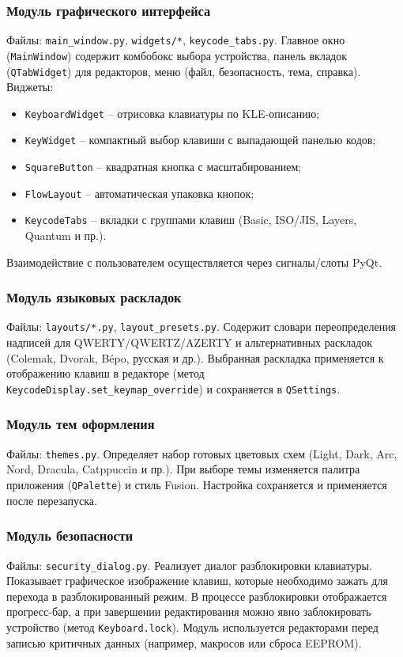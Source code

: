 \subsubsection{Модуль графического интерфейса}
Файлы: \texttt{main\_window.py}, \texttt{widgets/*}, \texttt{keycode\_tabs.py}.
Главное окно (\texttt{MainWindow}) содержит комбобокс выбора устройства, панель вкладок (\texttt{QTabWidget}) для редакторов, меню (файл, безопасность, тема, справка). Виджеты:
\begin{itemize}
	\item \texttt{KeyboardWidget} -- отрисовка клавиатуры по KLE-описанию;
	\item \texttt{KeyWidget} -- компактный выбор клавиши с выпадающей панелью кодов;
	\item \texttt{SquareButton} -- квадратная кнопка с масштабированием;
	\item \texttt{FlowLayout} -- автоматическая упаковка кнопок;
	\item \texttt{KeycodeTabs} -- вкладки с группами клавиш (Basic, ISO/JIS, Layers, Quantum и пр.).
\end{itemize}
Взаимодействие с пользователем осуществляется через сигналы/слоты PyQt.

\subsubsection{Модуль языковых раскладок}
Файлы: \texttt{layouts/*.py}, \texttt{layout\_presets.py}.
Содержит словари переопределения надписей для QWERTY/QWERTZ/AZERTY и альтернативных раскладок (Colemak, Dvorak, Bépo, русская и др.). Выбранная раскладка применяется к отображению клавиш в редакторе (метод \texttt{KeycodeDisplay.set\_keymap\_override}) и сохраняется в \texttt{QSettings}.

\subsubsection{Модуль тем оформления}
Файлы: \texttt{themes.py}.
Определяет набор готовых цветовых схем (Light, Dark, Arc, Nord, Dracula, Catppuccin и пр.). При выборе темы изменяется палитра приложения (\texttt{QPalette}) и стиль Fusion. Настройка сохраняется и применяется после перезапуска.

\subsubsection{Модуль безопасности}
Файлы: \texttt{security\_dialog.py}.
Реализует диалог разблокировки клавиатуры. Показывает графическое изображение клавиш, которые необходимо зажать для перехода в разблокированный режим. В процессе разблокировки отображается прогресс-бар, а при завершении редактирования можно явно заблокировать устройство (метод \texttt{Keyboard.lock}). Модуль используется редакторами перед записью критичных данных (например, макросов или сброса EEPROM).

